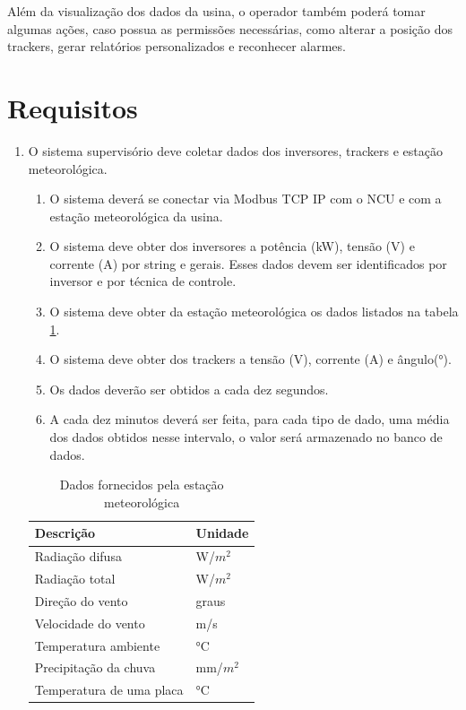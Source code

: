 \documentclass[a4paper,12pt]{article}
\begin{document}
Além da visualização dos dados da usina, o operador também poderá tomar algumas ações, caso possua as permissões necessárias, como alterar a posição dos trackers, gerar relatórios personalizados e reconhecer alarmes.




\section{Requisitos}
\begin{enumerate}
    \item O sistema supervisório deve coletar dados dos inversores, trackers e estação meteorológica.
    \begin{enumerate}
        \item O sistema deverá se conectar via Modbus TCP IP com o NCU e com a estação meteorológica da usina.
        \item O sistema deve obter dos inversores a potência (kW), tensão (V) e corrente (A) por string e gerais. Esses dados devem ser identificados por inversor e por técnica de controle.
        \item O sistema deve obter da estação meteorológica os dados listados na tabela \ref{tab:dados-estacao}.
        \item O sistema deve obter dos trackers a tensão (V), corrente (A) e ângulo(°).
        \item Os dados deverão ser obtidos a cada dez segundos.
        \item A cada dez minutos deverá ser feita, para cada tipo de dado, uma média dos dados obtidos nesse intervalo, o valor será armazenado no banco de dados.
    \end{enumerate}
    
    \begin{table}[htbp]
\begin{center}
\begin{tabular}{|l|l|}
\hline
\textbf{Descrição} & \textbf{Unidade} \\
\hline
Radiação difusa & W/$m^2$ \\
Radiação total & W/$m^2$ \\
Direção do vento & graus \\
Velocidade do vento & m/s\\
Temperatura ambiente & °C\\
Precipitação da chuva & mm/$m^2$\\
Temperatura de uma placa & °C \\
\hline
\end{tabular}
\caption{Dados fornecidos pela estação meteorológica}
\label{tab:dados-estacao}
\end{center}
\end{table}



\end{enumerate}
\end{document}
